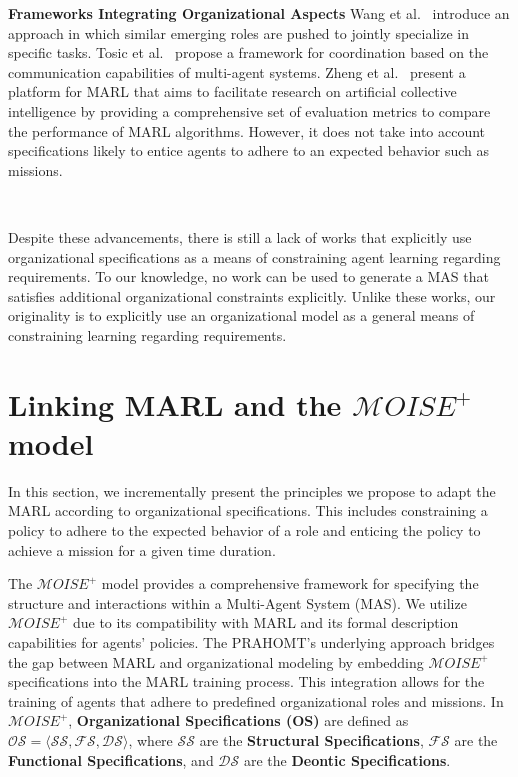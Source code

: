 \documentclass[sigconf,anonymous]{aamas}
\begin{document}
\textbf{Frameworks Integrating Organizational Aspects} \quad
%
Wang et al.~\cite{Wang2020} introduce an approach in which similar emerging roles are pushed to jointly specialize in specific tasks. Tosic et al.~\cite{Tosic2010} propose a framework for coordination based on the communication capabilities of multi-agent systems. Zheng et al.~\cite{Zheng2018} present a platform for MARL that aims to facilitate research on artificial collective intelligence by providing a comprehensive set of evaluation metrics to compare the performance of MARL algorithms. However, it does not take into account specifications likely to entice agents to adhere to an expected behavior such as missions.

\

Despite these advancements, there is still a lack of works that explicitly use organizational specifications as a means of constraining agent learning regarding requirements. To our knowledge, no work can be used to generate a MAS that satisfies additional organizational constraints explicitly. Unlike these works, our originality is to explicitly use an organizational model as a general means of constraining learning regarding requirements.


\section{Linking MARL and the $\mathcal{M}OISE^+$ model}\label{sec:linking_marl_moise}
\label{sec:marl_moise_linking}

In this section, we incrementally present the principles we propose to adapt the MARL according to organizational specifications. This includes constraining a policy to adhere to the expected behavior of a role and enticing the policy to achieve a mission for a given time duration.


The $\mathcal{M}OISE^+$ model provides a comprehensive framework for specifying the structure and interactions within a Multi-Agent System (MAS). We utilize $\mathcal{M}OISE^+$ due to its compatibility with MARL and its formal description capabilities for agents' policies. The PRAHOMT's underlying approach bridges the gap between MARL and organizational modeling by embedding $\mathcal{M}OISE^+$ specifications into the MARL training process. This integration allows for the training of agents that adhere to predefined organizational roles and missions.
%
In $\mathcal{M}OISE^+$, \textbf{Organizational Specifications (OS)} are defined as $\mathcal{OS} = \langle \mathcal{SS}, \mathcal{FS}, \mathcal{DS} \rangle$, where $\mathcal{SS}$ are the \textbf{Structural Specifications}, $\mathcal{FS}$ are the \textbf{Functional Specifications}, and $\mathcal{DS}$ are the \textbf{Deontic Specifications}.
\end{document}
